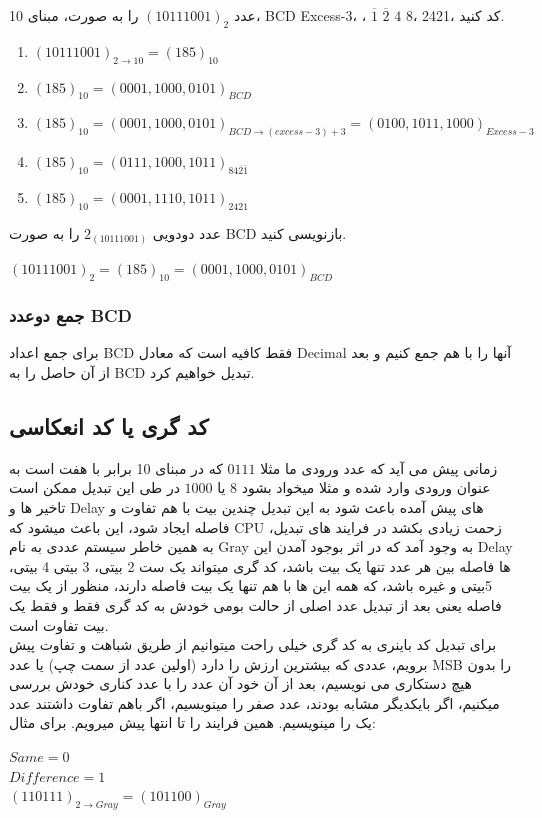 \documentclass[pt, a5paper]{article}
\begin{document}
عدد
$(10111001)_{2}$
را به صورت، مبنای 10،
BCD
Excess-3،
،
$\overline{1}$
$\overline{2}$
$4$
$8$،
2421، 
کد کنید.\\

\begin{enumerate}\raggedright
	\item
	$(10111001)_{2\rightarrow10} = (185)_{10}$
	\item
	$(185)_{10} = (0001,1000,0101)_{BCD}$
	\item
	$(185)_{10} = (0001,1000,0101)_{BCD\rightarrow (excess-3)+3} = (0100,1011,1000)_{Excess-3}$
	\item
	$(185)_{10} =(0111,1000,1011)_{84\overline{2}\overline{1}}$
	\item
	$(185)_{10} = (0001,1110,1011)_{2421}$
\end{enumerate}


\raggedleft
عدد دودویی ${2}_(10111001)$ را به صورت BCD بازنویسی کنید.\\
\raggedright
$(10111001)_{2} = (185)_{10} = (0001,1000,0101)_{BCD}$\\
\raggedleft

\justifying
\subsubsection{جمع دوعدد BCD}
برای جمع اعداد BCD فقط کافیه است که معادل Decimal آنها را با هم جمع کنیم و بعد از آن حاصل را به BCD تبدیل خواهیم کرد.\\
 
\subsection{کد گری یا کد انعکاسی}
زمانی پیش می آید که عدد ورودی ما مثلا
$0111$
که در مبنای 10 برابر با هفت است به عنوان ورودی وارد شده و مثلا میخواد بشود 8 یا $1000$ در طی این تبدیل ممکن است تاخیر ها و Delay های پیش آمده باعث شود به این تبدیل چندین بیت با هم تفاوت و فاصله ایجاد شود، این باعث میشود که CPU زحمت زیادی بکشد در فرایند های تبدیل، به همین خاطر سیستم عددی به نام Gray به وجود آمد که در اثر بوجود آمدن این Delay ها فاصله بین هر عدد تنها یک بیت باشد، کد گری میتواند یک ست 2 بیتی، 3 بیتی 4 بیتی، 5بیتی و غیره باشد، که همه این ها با هم تنها یک بیت فاصله دارند، منظور از یک بیت فاصله یعنی بعد از تبدیل عدد اصلی از حالت بومی خودش به کد گری فقط و فقط یک بیت تفاوت است.\\


 برای تبدیل کد باینری به کد گری خیلی راحت میتوانیم از طریق شباهت و تفاوت پیش برویم، عددی که بیشترین ارزش را دارد (اولین عدد از سمت چپ) یا عدد MSB را بدون هیچ دستکاری می نویسیم، بعد از آن خود آن عدد را با عدد کناری خودش بررسی میکنیم، اگر بایکدیگر مشابه بودند، عدد صفر را مینویسیم، اگر باهم تفاوت داشتند عدد یک را مینویسیم. همین فرایند را تا انتها پیش میرویم. برای مثال:\\
\raggedright
$Same = 0$\\
$Difference = 1$\\
$(110111)_{2\rightarrow Gray} = (101100)_{Gray}$\\
\end{document}
